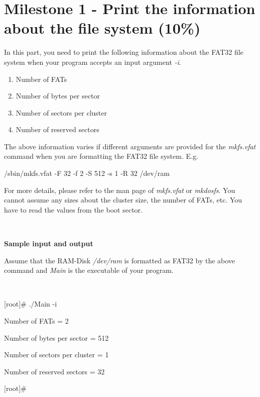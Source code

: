 \documentclass[a4paper,12pt]{article}
\begin{document}

\section*{Milestone 1 - Print the information about the file system (10\%)}

In this part, you need to print the following information about the FAT32 file system when your program accepts an input argument \textit{-i}.

\begin{enumerate}
  \addtolength{\itemsep}{-4mm}
    \item Number of FATs
    \item Number of bytes per sector
    \item Number of sectors per cluster
    \item Number of reserved sectors
\end{enumerate}

The above information varies if different arguments are provided for the \textit{mkfs.vfat} command when you are formatting the FAT32 file system. E.g.

\begin{center}
/sbin/mkfs.vfat -F 32 -f 2 -S 512 -s 1 -R 32 /dev/ram
\end{center}

For more details, please refer to the man page of \textit{mkfs.vfat} or \textit{mkdosfs}. You cannot assume any sizes about the cluster size, the number of FATs, etc. You have to read the values from the boot sector.

~

\noindent \textbf{Sample input and output}

Assume that the RAM-Disk \textit{/dev/ram} is formatted as FAT32 by the above command and \textit{Main} is the executable of your program.

~

\begin{tt}

[root]\# ./Main -i

Number of FATs = 2

Number of bytes per sector = 512

Number of sectors per cluster = 1

Number of reserved sectors = 32

[root]\#

\end{tt}
\end{document}
